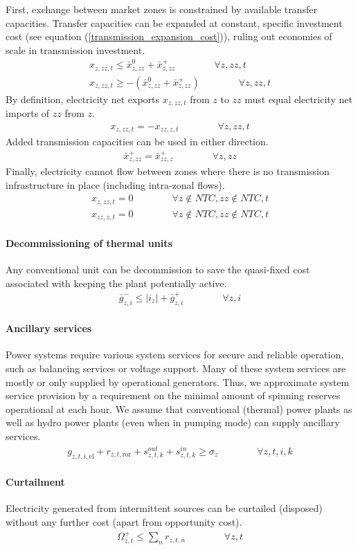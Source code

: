\documentclass[11pt,a4paper]{article}
\begin{document}
First, exchange between market zones is constrained by available transfer capacities. Transfer capacities can be expanded at constant, specific investment cost (see equation (\ref{transmission_expansion_cost})), ruling out economies of scale in transmission investment.
\begin{align}
x_{z,zz,t} \leq \bar{x}^{0}_{z,zz} + \bar{x}^{+}_{z,zz} \qquad \qquad \forall z, zz, t \\
x_{z,zz,t} \geq - \left( \bar{x}^{0}_{z,zz} + \bar{x}^{+}_{z,zz} \right) \qquad \qquad \forall z, zz, t
\end{align}
By definition, electricity net exports $x_{z,zz,t}$ from $z$ to $zz$ must equal electricity net imports of $zz$ from $z$.
\begin{align}
x_{z,zz,t} = -x_{zz,z,t} \qquad \qquad \forall z, zz, t
\end{align}
Added transmission capacities can be used in either direction.
\begin{align}
\bar{x}^{+}_{z,zz} = \bar{x}^{+}_{zz,z} \qquad \qquad \forall z, zz
\end{align}
Finally, electricity cannot flow between zones where there is no transmission infrastructure in place (including intra-zonal flows).
\begin{align}
x_{z,zz,t} = 0 \qquad \qquad \forall z \notin NTC, zz \notin NTC, t \\
x_{zz,z,t} = 0 \qquad \qquad \forall z \notin NTC, zz \notin NTC, t
\end{align}

\paragraph{Decommissioning of thermal units}
Any conventional unit can be decommission to save the quasi-fixed cost associated with keeping the plant potentially active.
\begin{align}
\bar{g}^{-}_{z,i} \leq |i_{z}| + \bar{g}^{+}_{z,i} \qquad \qquad \forall z,i
\end{align}

\paragraph{Ancillary services}
Power systems require various system services for secure and reliable operation, such as balancing services or voltage support. Many of these system services are mostly or only supplied by operational generators. Thus, we approximate system service provision by a requirement on the minimal amount of spinning reserves operational at each hour. 
We assume that conventional (thermal) power plants as well as hydro power plants (even when in pumping mode) can supply ancillary services.
\begin{align}
g_{z,t,i,\text{el}} + r_{z,t,\text{ror}} + s^{out}_{z,t,k} + s^{in}_{z,t,k} \geq \sigma_{z} \qquad \qquad \forall z,t,i,k
\end{align}

\paragraph{Curtailment}
Electricity generated from intermittent sources can be curtailed (disposed) without any further cost (apart from opportunity cost). 
\begin{align}
\Omega^{+}_{z,t} \leq \sum_{n} r_{z,t,n} \qquad \qquad \forall z, t
\end{align}
\end{document}

